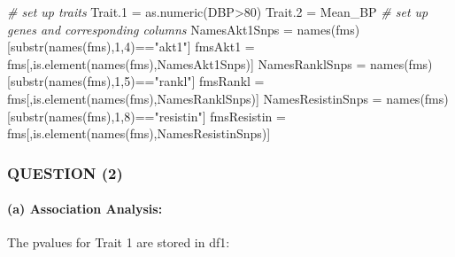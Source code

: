 \documentclass[
]{article}
\newenvironment{Shaded}{\begin{snugshade}}{\end{snugshade}}
\newcommand{\CommentTok}[1]{\textcolor[rgb]{0.56,0.35,0.01}{\textit{#1}}}
\newcommand{\DecValTok}[1]{\textcolor[rgb]{0.00,0.00,0.81}{#1}}
\newcommand{\FloatTok}[1]{\textcolor[rgb]{0.00,0.00,0.81}{#1}}
\newcommand{\FunctionTok}[1]{\textcolor[rgb]{0.00,0.00,0.00}{#1}}
\newcommand{\NormalTok}[1]{#1}
\newcommand{\OtherTok}[1]{\textcolor[rgb]{0.56,0.35,0.01}{#1}}
\newcommand{\SpecialCharTok}[1]{\textcolor[rgb]{0.00,0.00,0.00}{#1}}
\newcommand{\StringTok}[1]{\textcolor[rgb]{0.31,0.60,0.02}{#1}}
\begin{document}
\begin{Shaded}
\begin{Highlighting}[]
\CommentTok{\# set up traits}
\NormalTok{Trait}\FloatTok{.1} \OtherTok{=} \FunctionTok{as.numeric}\NormalTok{(DBP}\SpecialCharTok{\textgreater{}}\DecValTok{80}\NormalTok{)}
\NormalTok{Trait}\FloatTok{.2} \OtherTok{=}\NormalTok{ Mean\_BP}
\CommentTok{\# set up genes and corresponding columns}
\NormalTok{NamesAkt1Snps }\OtherTok{=} \FunctionTok{names}\NormalTok{(fms)[}\FunctionTok{substr}\NormalTok{(}\FunctionTok{names}\NormalTok{(fms),}\DecValTok{1}\NormalTok{,}\DecValTok{4}\NormalTok{)}\SpecialCharTok{==}\StringTok{"akt1"}\NormalTok{]}
\NormalTok{fmsAkt1 }\OtherTok{=}\NormalTok{ fms[,}\FunctionTok{is.element}\NormalTok{(}\FunctionTok{names}\NormalTok{(fms),NamesAkt1Snps)]}
\NormalTok{NamesRanklSnps }\OtherTok{=} \FunctionTok{names}\NormalTok{(fms)[}\FunctionTok{substr}\NormalTok{(}\FunctionTok{names}\NormalTok{(fms),}\DecValTok{1}\NormalTok{,}\DecValTok{5}\NormalTok{)}\SpecialCharTok{==}\StringTok{"rankl"}\NormalTok{]}
\NormalTok{fmsRankl }\OtherTok{=}\NormalTok{ fms[,}\FunctionTok{is.element}\NormalTok{(}\FunctionTok{names}\NormalTok{(fms),NamesRanklSnps)]}
\NormalTok{NamesResistinSnps }\OtherTok{=} \FunctionTok{names}\NormalTok{(fms)[}\FunctionTok{substr}\NormalTok{(}\FunctionTok{names}\NormalTok{(fms),}\DecValTok{1}\NormalTok{,}\DecValTok{8}\NormalTok{)}\SpecialCharTok{==}\StringTok{"resistin"}\NormalTok{]}
\NormalTok{fmsResistin }\OtherTok{=}\NormalTok{ fms[,}\FunctionTok{is.element}\NormalTok{(}\FunctionTok{names}\NormalTok{(fms),NamesResistinSnps)]}
\end{Highlighting}
\end{Shaded}

\hypertarget{question-2}{%
\subsubsection{QUESTION (2)}\label{question-2}}

\hypertarget{a-association-analysis}{%
\paragraph{(a) Association Analysis:}\label{a-association-analysis}}

The pvalues for Trait 1 are stored in df1:
\end{document}
